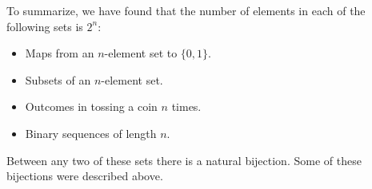 

\setcounter{section}{2}
\setcounter{subsection}{3}
\setcounter{dfn}{7}


To summarize, we have found that the number of elements in each of the following sets is $2^n$:
\begin{itemize}
\item
Maps from an $n$-element set to $\{0,1\}$.
\item
Subsets of an $n$-element set.
\item
Outcomes in tossing a coin $n$ times.
\item
Binary sequences of length $n$.
\end{itemize}

Between any two of these sets there is a natural bijection.
Some of these bijections were described above.



